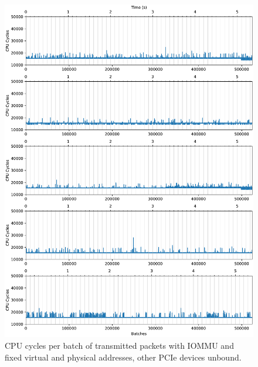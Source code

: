 \begin{figure}%
    \centering
    \includegraphics[width=1.0\textwidth]{figures/iotlb-baseline-iommu-pt-fixed-no-devs}
    \caption{CPU cycles per batch of transmitted packets with IOMMU and fixed
    virtual and physical addresses, other PCIe devices unbound.}
    \label{fig:cycles-iommu-pt-fixed-no-devs}
\end{figure}

